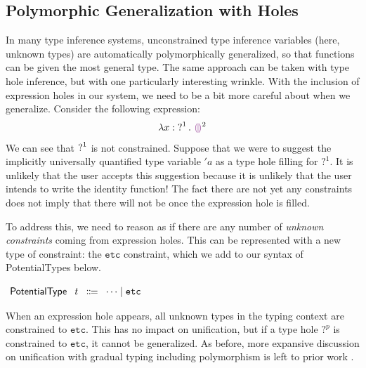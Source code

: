 \subsection{Polymorphic Generalization with Holes}
\label{sec:polymorphicGlobal}
In many type inference systems, unconstrained type inference variables (here, unknown types) are automatically polymorphically generalized, so that
functions can be given the most general type. The same approach can be taken with type hole inference, but with one particularly interesting wrinkle. With the inclusion of expression holes in our system, we need to be a bit more careful about when we generalize. Consider the following expression:
$$\ECLam{x}{\TUnknown^1}{\EEHole^2}$$
We can see that $\operatorname{?}^1$ is not constrained. Suppose that we were to suggest the implicitly universally quantified type variable $'a$ as a type hole filling for $?^1$. It is unlikely that the user accepts this suggestion because it is unlikely that the user intends to write the identity function!
The fact there are not yet any constraints does not imply that there will not be once the expression hole is filled.

To address this, we need to reason as if there are any number of \emph{unknown constraints} coming from expression holes.  This can be represented with a new type of constraint: the $\mathtt{etc}$ constraint, which we add to our syntax of \textsf{PotentialType}s below. 
\begin{center}
$\arraycolsep=4pt\begin{array}{rrcl}
  \textsf{PotentialType} & t & \Coloneqq & \dots \mid \mathtt{etc}
\end{array}$
\end{center}
When an expression hole appears, all unknown types in the typing context are constrained to $\mathtt{etc}$. This has no impact on unification, but if a type hole $?^p$ is constrained to $\mathtt{etc}$, it cannot be generalized. As before, more expansive discussion on unification with gradual typing including polymorphism is left to prior work \cite{garcia:2015}.

